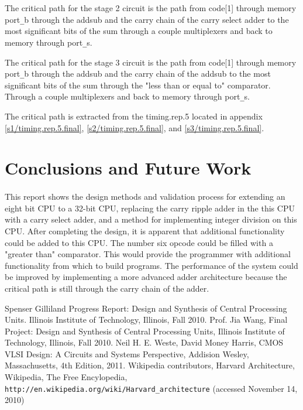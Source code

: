 \documentclass[11pt,letterpaper,final]{article}
\begin{document}
The critical path for the stage 2 circuit is the path from code[1] through memory port\verb=_=b through the addsub and the carry chain of the carry select adder to the most significant bits of the sum through a couple multiplexers and back to memory through port\verb=_=s.

The critical path for the stage 3 circuit is the path from code[1] through memory port\verb=_=b through the addsub and the carry chain of the addsub to the most significant bits of the sum through the "less than or equal to" comparator.  Through a couple multiplexers and back to memory through port\verb=_=s.

The critical path is extracted from the timing.rep.5 located in appendix \ref{s1/timing.rep.5.final}, \ref{s2/timing.rep.5.final}, and \ref{s3/timing.rep.5.final}.

\section{ Conclusions and Future Work }
\paragraph{}
This report shows the design methods and validation process for extending an
eight bit CPU to a 32-bit CPU, replacing the carry ripple adder in the this CPU
with a carry select adder, and a method for implementing integer division on this
CPU.  After completing the design, it is apparent that additional functionality could be added to this CPU.  The number six opcode could be filled with a "greater than" comparator.  This would provide the programmer with additional functionality from which to build programs.  The performance of the system could be improved by implementing a more advanced adder architecture because the critical path is still through the carry chain of the adder.

\pagebreak{}
\begin{thebibliography}{widestlabel}
  Spenser Gilliland
  Progress Report: Design and Synthesis of Central Processing Units.
  Illinois Institute of Technology, Illinois,
  Fall 2010.
  Prof. Jia Wang,
  Final Project: Design and Synthesis of Central Processing Units,
  Illinois Institute of Technology, Illinois,
  Fall 2010.
  Neil H. E. Weste, David Money Harris,
  CMOS VLSI Design: A Circuits and Systems Perspective,
  Addision Wesley, Massachusetts,
  4th Edition,
  2011.
  Wikipedia contributors,
  Harvard Architecture,
  Wikipedia, The Free Encylopedia,
  \verb|http://en.wikipedia.org/wiki/Harvard_architecture| (accessed November
14, 2010)
\end{thebibliography}
\end{document}
